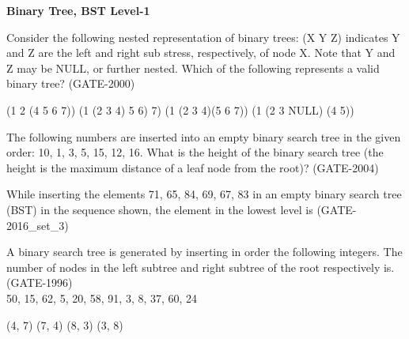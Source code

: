 
\centerline{\textbf{ \LARGE Binary Tree, BST Level-1}}

\begin{questyle}
  \question  Consider the following nested representation of binary trees: (X Y Z) indicates Y and Z
            are the left and right sub stress, respectively, of node X. Note that Y and Z may be NULL, or
            further nested. Which of the following represents a valid binary tree?  (GATE-2000)

  \begin{choices}
    \choice         (1 2 (4 5 6 7))
    \choice         (1 (2 3 4) 5 6) 7)
    \CorrectChoice  (1 (2 3 4)(5 6 7))
    \choice         (1 (2 3 NULL) (4 5))
  \end{choices}
\end{questyle}

\begin{questyle}
  \question  The following numbers are inserted into an empty binary search tree in the given
            order: 10, 1, 3, 5, 15, 12, 16. What is the height of the binary search tree
            (the height is the maximum distance of a leaf node from the root)?  (GATE-2004)

  \begin{oneparchoices}
  \end{oneparchoices}
\end{questyle}

\begin{questyle}
  \question  While inserting the elements 71, 65, 84, 69, 67, 83 in an empty binary search tree (BST)
            in the sequence shown, the element in the lowest level is  (GATE-2016\_set\_3)

  \begin{oneparchoices}
  \end{oneparchoices}
\end{questyle}

\begin{questyle}
  \question  A binary search tree is generated by inserting in order the following integers.
            The number of nodes in the left subtree and right subtree of the root respectively is. (GATE-1996)\\
            50, 15, 62, 5, 20, 58, 91, 3, 8, 37, 60, 24

  \begin{oneparchoices}
    \choice         (4, 7)
    \CorrectChoice  (7, 4)
    \choice         (8, 3)
    \choice         (3, 8)
  \end{oneparchoices}
\end{questyle}



